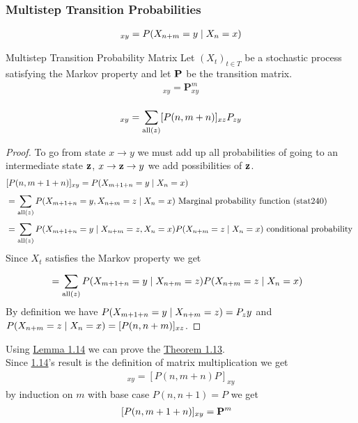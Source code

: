 \documentclass[12pt,a4paper]{article}
\begin{document}
\subsubsection{Multistep Transition Probabilities}
\begin{defn}
\begin{align*}
[P(n, n+m)]_{xy} = P(X_{n+m} = y \given X_{n} = x)
\end{align*}
\end{defn}

\begin{thm}{Multistep Transition Probability Matrix}
\label{thm113}
Let $(X_t)_{t\in T}$ be a stochastic process satisfying the Markov property and let $\bf P$ be the transition matrix.  
\begin{align*}
[P(n, n+m)]_{xy} = \mathbf{P}^m_{xy}
\end{align*}
\end{thm}
\begin{lemma}{}
\label{lem114}
\begin{align*}
[P(n, m+1+n)]_{xy} = \nsum{\mathrm{all}(z)}{}[P(n,m+n)]_{xz}P_{zy}
\end{align*}
\end{lemma}
\begin{proof}
To go from state $x \to y$ we must add up all probabilities of going to an intermediate state $\bf z$, $x \to {\bf z} \to y$ we add possibilities of $\bf z$. 
\begin{align*}
&[P(n, m+1+n)]_{xy} = P(X_{m+1+n} = y \;\vert\; X_{n} = x)\\
&= \sum\limits_{\mathrm{all}(z)}^{} P(X_{m+1+n} = y, X_{n+m} = z \;\vert\; X_{n} = x) \text{ Marginal probability function (stat240) }\\
&= \sum\limits_{\mathrm{all}(z)}^{} P(X_{m+1+n} = y \;\vert\; X_{n+m} = z , X_{n} = x)P(X_{n+m} = z \;\vert\; X_n = x) \text{ conditional probability }
\end{align*}
Since $X_t$ satisfies the Markov property we get
\begin{align*}
&= \sum\limits_{\mathrm{all}(z)}^{} P(X_{m+1+n} = y \;\vert\; X_{n+m} = z)P(X_{n+m} = z \;\vert\; X_n = x)
\end{align*}
By definition we have $P(X_{m+1+n} = y \;\vert\; X_{n+m} = z) = P_zy$ and $P(X_{n+m} = z \;\vert\; X_n = x) = [P(n, n+m)]_{xz}$. 
\end{proof}
\newpage
Using \hyperref[lem114]{Lemma 1.14} we can prove the \hyperref[thm113]{Theorem 1.13}. \\
Since  \hyperref[lem114]{1.14}'s result is the definition of matrix multiplication we get
\begin{align*}
[P(n, m+1+n)]_{xy} = [P(n, m+n)P]_{xy}
\end{align*}
by induction on $m$ with base case $P(n, n+1) = P$ we get
\begin{align*}
&[P(n, m+1+n)]_{xy} = {\bf P}^m
\end{align*}
 
\end{document}
